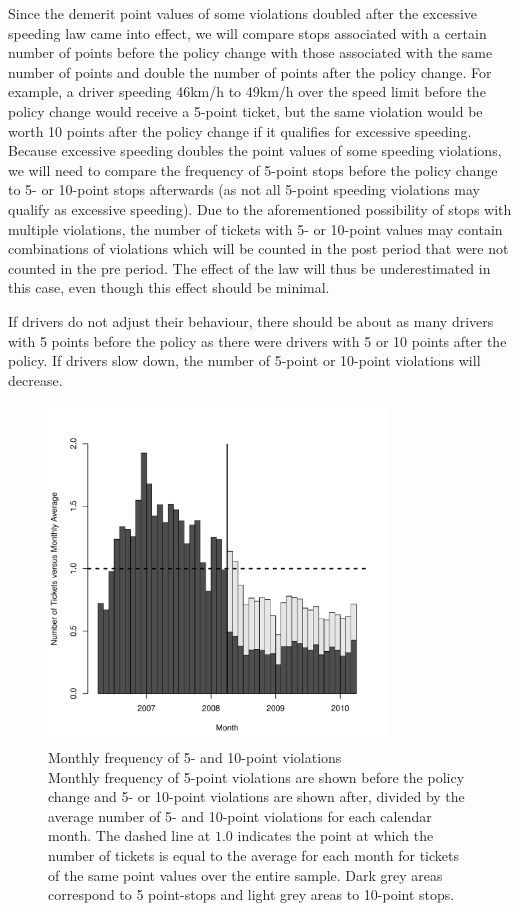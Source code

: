 Since the demerit point values of some violations doubled 
after the excessive speeding law came into effect, 
% 
we will compare stops associated with a certain number of points 
before the policy change with those associated with the 
same number of points and double the number of points after the policy change. 
For example, a driver speeding 46km/h to 49km/h over the speed limit 
before the policy change would receive a 5-point ticket, 
but the same violation would be worth 10 points after the policy change 
if it qualifies for excessive speeding. 
Because excessive speeding doubles the point values of some speeding violations, 
we will need to compare the frequency of 5-point stops before the policy change 
to 5- or 10-point stops afterwards 
(as not all 5-point speeding violations may qualify as excessive speeding). 
Due to the aforementioned possibility of stops with multiple violations, 
the number of tickets with 5- or 10-point values may contain 
combinations of violations which will be counted in the post period 
that were not counted in the pre period. The effect of the law 
will thus be underestimated in this case, even though this effect should be minimal.

If drivers do not adjust their behaviour, 
there should be about as many drivers with 5 points before the policy 
as there were drivers with 5 or 10 points after the policy. 
If drivers slow down, the number of 5-point or 10-point violations will decrease. 


\begin{figure}
\centering
\includegraphics[width=0.8\textwidth]{Figures/num_pts_5_10_all}
\caption{Monthly frequency of 5- and 10-point violations \\
Monthly frequency of 5-point violations are shown before the policy change 
and 5- or 10-point violations are shown after, 
divided by the average number of 5- and 10-point violations
for each calendar month. 
% 
The dashed line at $1.0$ indicates the point at which 
the number of tickets is equal to the average for each month 
for tickets of the same point values over the entire sample.
% 
Dark grey areas correspond to 5 point-stops and light grey areas to 10-point stops.
}\label{fig:num_pts_5_10_all}
\end{figure}


